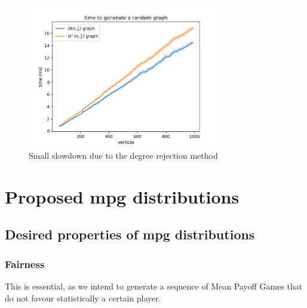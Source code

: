 \begin{figure}[H]
	\centering
	\includegraphics[width=0.75\textwidth]{Figures/DegreeSparseGraphGen.png}
	\caption{Small slowdown due to the degree rejection method}
\end{figure}
\FloatBarrier


\section{Proposed \acrshort{mpg} distributions}
\subsection{Desired properties of \acrshort{mpg} distributions}
\subsubsection{Fairness}
This is essential, as we intend to generate a sequence of Mean Payoff Games that do not favour statistically a certain player.

